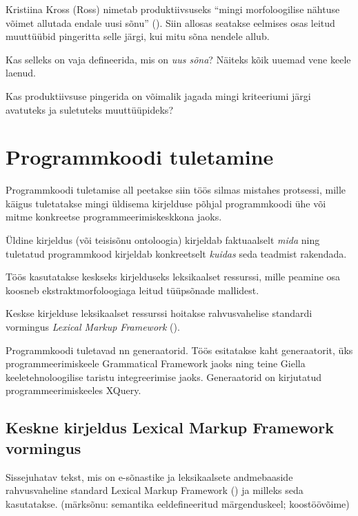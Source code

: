 \documentclass[12pt,a4paper]{article}
\begin{document}
Kristiina Kross (Ross) nimetab produktiivsuseks ``mingi morfoloogilise nähtuse võimet allutada endale uusi sõnu'' (\cite{kross_eesti_1984}). Siin allosas seatakse eelmises osas leitud muuttüübid pingeritta selle järgi, kui mitu sõna nendele allub.

Kas selleks on vaja defineerida, mis on \textit{uus sõna}? Näiteks kõik uuemad vene keele laenud.

Kas produktiivsuse pingerida on võimalik jagada mingi kriteeriumi järgi avatuteks ja suletuteks muuttüüpideks?





\newpage
\section{Programmkoodi tuletamine}
\label{sec:programmkoodi-tuletamine}

Programmkoodi tuletamise all peetakse siin töös silmas mistahes protsessi, mille käigus tuletatakse mingi üldisema kirjelduse põhjal programmkoodi ühe või mitme konkreetse programmeerimiskeskkona jaoks.

Üldine kirjeldus (või teisisõnu ontoloogia) kirjeldab faktuaalselt \textit{mida} ning tuletatud programmkood kirjeldab konkreetselt \textit{kuidas} seda teadmist rakendada.

Töös kasutatakse keskseks kirjelduseks leksikaalset ressurssi, mille peamine osa koosneb ekstraktmorfoloogiaga leitud tüüpsõnade mallidest.

Keskse kirjelduse leksikaalset ressurssi hoitakse rahvusvahelise standardi vormingus \textit{Lexical Markup Framework} (\cite{iso/tc_37/sc_4_language_2007}).

Programmkoodi tuletavad nn generaatorid. Töös esitatakse kaht generaatorit, üks programmeerimiskeele Grammatical Framework jaoks ning teine Giella keeletehnoloogilise taristu integreerimise jaoks. Generaatorid on kirjutatud programmeerimiskeeles XQuery.




\subsection{Keskne kirjeldus Lexical Markup Framework vormingus}

Sissejuhatav tekst, mis on e-sõnastike ja leksikaalsete andmebaaside rahvusvaheline standard Lexical Markup Framework (\cite{iso/tc_37/sc_4_language_2007}) ja milleks seda kasutatakse. (märksõnu: semantika eeldefineeritud märgenduskeel; koostöövõime)
\end{document}
